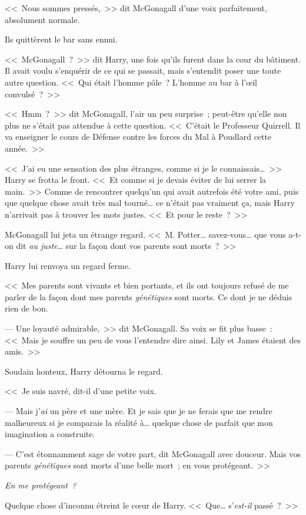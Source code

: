 <<~Nous sommes pressés,~>> dit McGonagall d'une voix parfaitement, absolument normale.

Ils quittèrent le bar sans ennui.

<<~McGonagall~?~>> dit Harry, une fois qu'ils furent dans la cour du bâtiment. Il avait voulu s'enquérir de ce qui se passait, mais s'entendit poser une toute autre question. <<~Qui était l'homme pâle~? L'homme au bar à l'œil convulsé~?~>>

<<~Hmm~?~>> dit McGonagall, l'air un peu surprise~; peut-être qu'elle non plus ne s'était pas attendue à cette question. <<~C'était le Professeur Quirrell. Il va enseigner le cours de Défense contre les forces du Mal à Poudlard cette année.~>>

<<~J'ai eu une sensation des plus étranges, comme si je le connaissais…~>> Harry se frotta le front. <<~Et comme si je devais éviter de lui serrer la main.~>> Comme de rencontrer quelqu'un qui avait autrefois été votre ami, puis que quelque chose avait très mal tourné… ce n'était pas vraiment ça, mais Harry n'arrivait pas à trouver les mots justes. <<~Et pour le reste~?~>>

McGonagall lui jeta un étrange regard. <<~M. Potter… savez-vous… que vous a-t-on dit \emph{au juste}… sur la façon dont vos parents sont morts~?~>>

Harry lui renvoya un regard ferme.

<<~Mes parents sont vivants et bien portants, et ils ont toujours refusé de me parler de la façon dont mes parents \emph{génétiques} sont morts. Ce dont je ne déduis rien de bon.

--- Une loyauté admirable,~>> dit McGonagall. Sa voix se fit plus basse~: <<~Mais je souffre un peu de vous l'entendre dire ainsi. Lily et James étaient des amis.~>>

Soudain honteux, Harry détourna le regard.

<<~Je suis navré, dit-il d'une petite voix.

--- Mais j'\emph{ai} un père et une mère. Et je sais que je ne ferais que me rendre malheureux si je comparais la réalité à… quelque chose de parfait que mon imagination a construite.

--- C'est étonnamment sage de votre part, dit McGonagall avec douceur. Mais vos parents \emph{génétiques} sont morts d'une belle mort~; en vous protégeant.~>>

\emph{En me protégeant~?}

Quelque chose d'inconnu étreint le cœur de Harry. <<~Que… s'\emph{est-il} passé~?~>>

